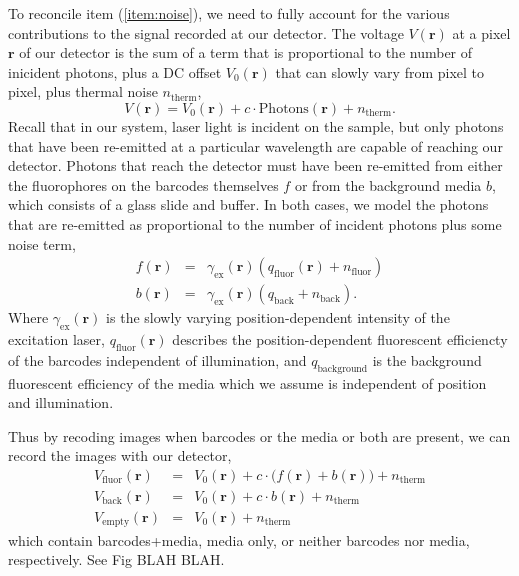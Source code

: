 To reconcile item (\ref{item:noise}), we need to fully account for the various contributions to the signal recorded at our detector. The voltage $V(\mathbf{r})$ at a pixel $\mathbf{r}$ of our detector is the sum of a term that is proportional to the number of inicident photons, plus a DC offset $V_0(\mathbf{r})$ that can slowly vary from pixel to pixel, plus thermal noise $n_{\text{therm}}$,
\begin{equation}
V(\mathbf{r})=V_0(\mathbf{r})+c \cdot \text{Photons}(\mathbf{r}) +n_{\text{therm}}.
\end{equation}
Recall that in our system, laser light is incident on the sample, but only photons that have been re-emitted at a particular wavelength are capable of reaching our detector.  Photons that reach the detector must have been re-emitted from either the fluorophores on the barcodes themselves $f$ or from the background media $b$, which consists of a glass slide and buffer.  In both cases, we model the photons that are re-emitted as proportional to the number of incident photons plus some noise term,
\begin{eqnarray}
f(\mathbf{r})&=&\gamma_{\text{ex}}(\mathbf{r}) ( q_{\text{fluor}}(\mathbf{r}) + n_{\text{fluor}} )\\
b(\mathbf{r})&=&\gamma_{\text{ex}}(\mathbf{r}) ( q_{\text{back}} + n_{\text{back}} ).
\end{eqnarray}
Where  $\gamma_{\text{ex}}(\mathbf{r})$ is the slowly varying position-dependent intensity of the excitation laser,  $q_{\text{fluor}}(\mathbf{r})$ describes the position-dependent fluorescent efficiencty of the barcodes independent of illumination, and $q_{\text{background}}$ is the background fluorescent efficiency of the media which we assume is independent of position and illumination. 

Thus by recoding images when barcodes or the media or both are present, we can record the  images with our detector,
\begin{eqnarray}
V_{\text{fluor}}(\mathbf{r})&=&V_0(\mathbf{r})+c \cdot \big( f(\mathbf{r}) + b(\mathbf{r})\big)  +n_{\text{therm}}\\
V_{\text{back}}(\mathbf{r})&=&V_0(\mathbf{r})+c \cdot  b(\mathbf{r})  +n_{\text{therm}}\\
V_{\text{empty}}(\mathbf{r})&=&V_0(\mathbf{r})+n_{\text{therm}}
\end{eqnarray}
which contain barcodes+media, media only, or neither barcodes nor media, respectively. See Fig BLAH BLAH. 

